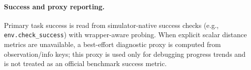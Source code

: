 \documentclass{article}
\begin{document}
\paragraph{Success and proxy reporting.}
Primary task success is read from simulator-native success checks (e.g., \texttt{env.check\_success}) with wrapper-aware probing. When explicit scalar distance metrics are unavailable, a best-effort diagnostic proxy is computed from observation/info keys; this proxy is used only for debugging progress trends and is not treated as an official benchmark success metric.


\end{document}
